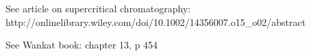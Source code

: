 See article on supercritical chromatography: http://onlinelibrary.wiley.com/doi/10.1002/14356007.o15_o02/abstract

See Wankat book: chapter 13, p 454